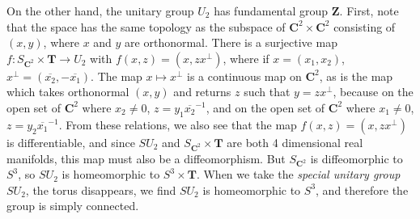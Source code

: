 \begin{example}
    On the other hand, the unitary group $U_2$ has fundamental group $\mathbf{Z}$. First, note that the space has the same topology as the subspace of $\mathbf{C}^2 \times \mathbf{C}^2$ consisting of $(x,y)$, where $x$ and $y$ are orthonormal. There is a surjective map $f: S_{\mathbf{C}^2} \times \mathbf{T} \to U_2$ with $f(x,z) = (x, zx^\perp)$, where if $x = (x_1, x_2)$, $x^\perp = (\overline{x_2}, -\overline{x_1})$. The map $x \mapsto x^\perp$ is a continuous map on $\mathbf{C}^2$, as is the map which takes orthonormal $(x,y)$ and returns $z$ such that $y = zx^\perp$, because on the open set of $\mathbf{C}^2$ where $x_2 \neq 0$, $z = y_1 \overline{x_2}^{-1}$, and on the open set of $\mathbf{C}^2$ where $x_1 \neq 0$, $z = y_2 \overline{x_1}^{-1}$. From these relations, we also see that the map $f(x,z) = (x,zx^\perp)$ is differentiable, and since $SU_2$ and $S_{\mathbf{C}^2} \times \mathbf{T}$ are both 4 dimensional real manifolds, this map must also be a diffeomorphism. But $S_{\mathbf{C}^2}$ is diffeomorphic to $S^3$, so $SU_2$ is homeomorphic to $S^3 \times \mathbf{T}$. When we take the {\it special unitary group} $SU_2$, the torus disappears, we find $SU_2$ is homeomorphic to $S^3$, and therefore the group is simply connected.
\end{example}

